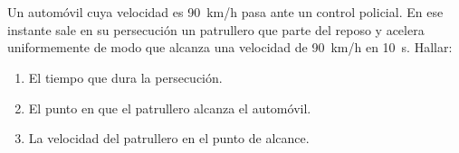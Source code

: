 \documentclass[a4paper, 12pt, fleqn]{article}
\begin{document}
\section{}

Un automóvil cuya velocidad es \SI{90}{km/h} pasa ante un control policial. En ese instante sale en su persecución un patrullero que parte del reposo y acelera uniformemente de modo que alcanza una velocidad de \SI{90}{km/h} en \SI{10}{s}. Hallar:
    \begin{enumerate}[label=(\alph*)]
        \item El tiempo que dura la persecución.
        \item El punto en que el patrullero alcanza el automóvil.
        \item La velocidad del patrullero en el punto de alcance.
    \end{enumerate}
\end{document}
